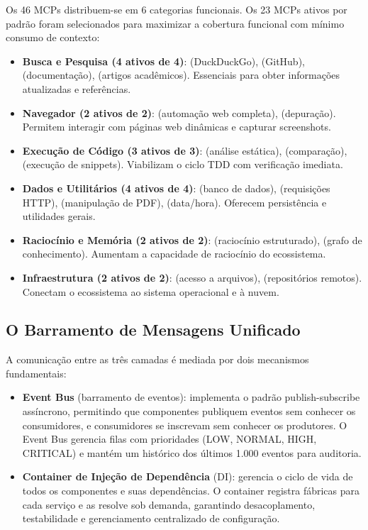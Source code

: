 Os 46 MCPs distribuem-se em 6 categorias funcionais. Os 23 MCPs ativos por
padrão foram selecionados para maximizar a cobertura funcional com mínimo
consumo de contexto:

\begin{itemize}
  \item \textbf{Busca e Pesquisa (4 ativos de 4)}:
         (DuckDuckGo),  (GitHub), 
        (documentação),  (artigos acadêmicos). Essenciais para
        obter informações atualizadas e referências.
  \item \textbf{Navegador (2 ativos de 2)}:
         (automação web completa), 
        (depuração). Permitem interagir com páginas web dinâmicas e
        capturar screenshots.
  \item \textbf{Execução de Código (3 ativos de 3)}:
         (análise estática),  (comparação),
         (execução de snippets). Viabilizam o ciclo
        TDD com verificação imediata.
  \item \textbf{Dados e Utilitários (4 ativos de 4)}:
         (banco de dados),  (requisições HTTP),
         (manipulação de PDF),  (data/hora).
        Oferecem persistência e utilidades gerais.
  \item \textbf{Raciocínio e Memória (2 ativos de 2)}:
         (raciocínio estruturado),
         (grafo de conhecimento). Aumentam a capacidade
        de raciocínio do ecossistema.
  \item \textbf{Infraestrutura (2 ativos de 2)}:
         (acesso a arquivos), 
        (repositórios remotos). Conectam o ecossistema ao sistema
        operacional e à nuvem.
\end{itemize}

\subsection{O Barramento de Mensagens Unificado}

A comunicação entre as três camadas é mediada por dois mecanismos
fundamentais:

\begin{itemize}
  \item \textbf{Event Bus} (barramento de eventos): implementa o padrão
        publish-subscribe assíncrono, permitindo que componentes publiquem
        eventos sem conhecer os consumidores, e consumidores se inscrevam
        sem conhecer os produtores. O Event Bus gerencia filas com
        prioridades (LOW, NORMAL, HIGH, CRITICAL) e mantém um histórico
        dos últimos 1.000 eventos para auditoria.
  \item \textbf{Container de Injeção de Dependência} (DI): gerencia o ciclo
        de vida de todos os componentes e suas dependências. O container
        registra fábricas para cada serviço e as resolve sob demanda,
        garantindo desacoplamento, testabilidade e gerenciamento centralizado
        de configuração.
\end{itemize}

